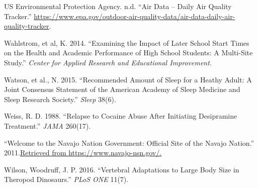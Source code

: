 \documentclass[
]{report}
\newlength{\cslhangindent}
\newenvironment{CSLReferences}[2] %
 {\begin{list}{}{%
  \setlength{\itemindent}{0pt}
  \setlength{\leftmargin}{0pt}
  \setlength{\parsep}{0pt}
  \ifodd #1
   \setlength{\leftmargin}{\cslhangindent}
   \setlength{\itemindent}{-1\cslhangindent}
  \fi
  \setlength{\itemsep}{#2\baselineskip}}}
 {\end{list}}
\begin{document}
\begin{CSLReferences}{1}{0}
US Environmental Protection Agency. n.d. {``Air Data -- Daily Air Quality Tracker.''} \url{https://www.epa.gov/outdoor-air-quality-data/air-data-daily-air-quality-tracker}.

Wahlstrom, et al, K. 2014. {``Examining the Impact of Later School Start Times on the Health and Academic Performance of High School Students: A Multi-Site Study.''} \emph{Center for Applied Research and Educational Improvement}.

Watson, et al., N. 2015. {``Recommended Amount of Sleep for a Heathy Adult: A Joint Consensus Statement of the American Academy of Sleep Medicine and Sleep Research Society.''} \emph{Sleep} 38(6).

Weiss, R. D. 1988. {``Relapse to Cocaine Abuse After Initiating Desipramine Treatment.''} \emph{JAMA} 260(17).

{``Welcome to the Navajo Nation Government: Official Site of the Navajo Nation.''} 2011.\href{\%20Retrieved\%20from\%20https://www.navajo-nsn.gov/.}{Retrieved from https://www.navajo-nsn.gov/.}

Wilson, Woodruff, J. P. 2016. {``Vertebral Adaptations to Large Body Size in Theropod Dinosaurs.''} \emph{PLoS ONE} 11(7).

\end{CSLReferences}
\end{document}
